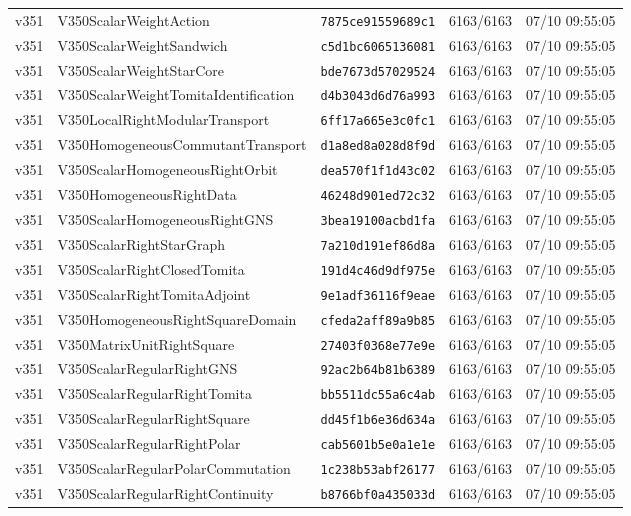\documentclass[11pt]{article}
\theoremstyle{definition}\newtheorem{deriv}{Derivação}
\begin{document}
{\begin{longtable}{@{}lllll@{}}
v351 & V350ScalarWeightAction & \texttt{7875ce91559689c1} & 6163/6163 & 07/10 09:55:05 \\
v351 & V350ScalarWeightSandwich & \texttt{c5d1bc6065136081} & 6163/6163 & 07/10 09:55:05 \\
v351 & V350ScalarWeightStarCore & \texttt{bde7673d57029524} & 6163/6163 & 07/10 09:55:05 \\
v351 & V350ScalarWeightTomitaIdentification & \texttt{d4b3043d6d76a993} & 6163/6163 & 07/10 09:55:05 \\
v351 & V350LocalRightModularTransport & \texttt{6ff17a665e3c0fc1} & 6163/6163 & 07/10 09:55:05 \\
v351 & V350HomogeneousCommutantTransport & \texttt{d1a8ed8a028d8f9d} & 6163/6163 & 07/10 09:55:05 \\
v351 & V350ScalarHomogeneousRightOrbit & \texttt{dea570f1f1d43c02} & 6163/6163 & 07/10 09:55:05 \\
v351 & V350HomogeneousRightData & \texttt{46248d901ed72c32} & 6163/6163 & 07/10 09:55:05 \\
v351 & V350ScalarHomogeneousRightGNS & \texttt{3bea19100acbd1fa} & 6163/6163 & 07/10 09:55:05 \\
v351 & V350ScalarRightStarGraph & \texttt{7a210d191ef86d8a} & 6163/6163 & 07/10 09:55:05 \\
v351 & V350ScalarRightClosedTomita & \texttt{191d4c46d9df975e} & 6163/6163 & 07/10 09:55:05 \\
v351 & V350ScalarRightTomitaAdjoint & \texttt{9e1adf36116f9eae} & 6163/6163 & 07/10 09:55:05 \\
v351 & V350HomogeneousRightSquareDomain & \texttt{cfeda2aff89a9b85} & 6163/6163 & 07/10 09:55:05 \\
v351 & V350MatrixUnitRightSquare & \texttt{27403f0368e77e9e} & 6163/6163 & 07/10 09:55:05 \\
v351 & V350ScalarRegularRightGNS & \texttt{92ac2b64b81b6389} & 6163/6163 & 07/10 09:55:05 \\
v351 & V350ScalarRegularRightTomita & \texttt{bb5511dc55a6c4ab} & 6163/6163 & 07/10 09:55:05 \\
v351 & V350ScalarRegularRightSquare & \texttt{dd45f1b6e36d634a} & 6163/6163 & 07/10 09:55:05 \\
v351 & V350ScalarRegularRightPolar & \texttt{cab5601b5e0a1e1e} & 6163/6163 & 07/10 09:55:05 \\
v351 & V350ScalarRegularPolarCommutation & \texttt{1c238b53abf26177} & 6163/6163 & 07/10 09:55:05 \\
v351 & V350ScalarRegularRightContinuity & \texttt{b8766bf0a435033d} & 6163/6163 & 07/10 09:55:05 \\

\end{longtable}}
\end{document}
